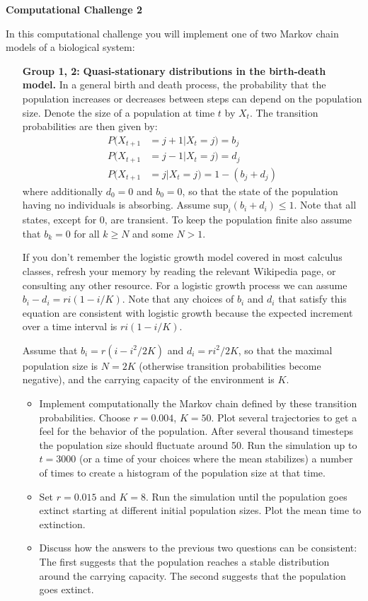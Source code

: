 \documentclass[12pt]{article}
\begin{document}
\vskip5mm 


\begin{center}
{\Large \bf Computational Challenge 2
\\ \vskip5mm }
\end{center}


In this computational challenge you will implement one of two Markov chain models of a biological system:

\begin{enumerate}
\item[\bf Group 1, 2:] {\bf Quasi-stationary distributions in the birth-death model.}  In a general birth and death process, the probability that the 
population increases or decreases between steps can depend on the population size.  Denote the
size of a population at time $t$ by $X_t$. The transition probabilities are then given by:
\begin{align*}
P(X_{t+1} &= j+1 | X_{t} = j) = b_j \\
P(X_{t+1} &= j-1 | X_{t} = j) = d_j \\
P(X_{t+1} &= j | X_{t} = j) = 1 - ( b_j + d_j) 
\end{align*}
where additionally $d_0 = 0$ and $b_ 0 = 0$, so that the state of the population having no individuals is absorbing.  Assume
$\text{sup}_i ( b_i + d_i) \leq 1$.  Note that all states, except for 0, are transient.  To keep the population finite 
also assume that $b_k = 0$ for all $k \geq N$ and some $N >1$.

If you don't remember the logistic growth model covered in most calculus classes, refresh your memory by reading the relevant Wikipedia page, or
consulting any other resource. For a logistic growth process we can assume $b_i - d_i = ri (1 - i/K)$. Note that any choices of $b_i$ and $d_i$
that satisfy this equation are consistent with logistic growth because the expected increment over a time interval is $ri (1 - i/K)$.

Assume that $b_i = r(i - i^2/2K)$ and $d_i = r i^2/2K$, so that the maximal population size is $N = 2K$ (otherwise transition probabilities become negative), 
and the carrying capacity of the environment is $K$.
\begin{itemize}
\item Implement computationally the Markov chain defined by these transition probabilities.  Choose $r = 0.004$, $K = 50$.  Plot several trajectories to get
a feel for the behavior of the population.  After several thousand timesteps the population size should fluctuate around 50.  Run the simulation 
up to $t = 3000$ (or a time of your choices where the mean stabilizes) a number of times to create a histogram of the population size at that time. 
\item Set $r = 0.015$ and $K = 8$.  Run the simulation until the population goes extinct starting at different initial population sizes.  Plot the mean 
time to extinction.
\item Discuss how the answers to the previous two questions can be consistent: The first suggests that the population reaches a stable distribution
around the carrying capacity.  The second suggests that the population goes extinct.
\end{itemize}



\end{enumerate}
\end{document}
